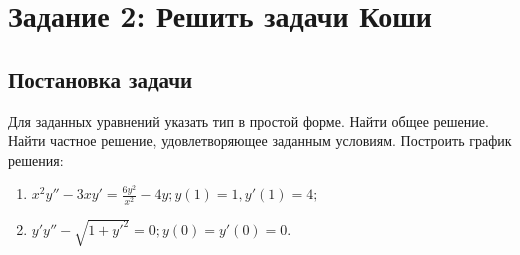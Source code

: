 \section{Задание 2: Решить задачи Коши}
    \subsection{Постановка задачи}
        Для заданных уравнений указать тип в простой форме. Найти общее решение. Найти частное решение, удовлетворяющее заданным условиям. Построить график решения:

        \begin{enumerate}
            \item \( x^2 y'' - 3xy' = \frac{6y^2}{x^2} - 4y; y(1) = 1, y'(1) = 4; \)
            \item \( y'y'' - \sqrt{1+y'^2} = 0; y(0) = y'(0) = 0. \)
        \end{enumerate}

    
